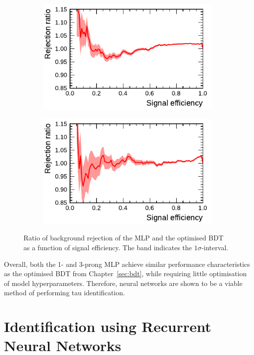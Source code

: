 \begin{figure}[htb]
  \begin{subfigure}[t]{0.48\textwidth}
    \centering
    \includegraphics{./figures/rnn/mlp/mlp_bdt_ratio_1p.pdf}
  \end{subfigure}\hfill
  \begin{subfigure}[t]{0.48\textwidth}
    \centering
    \includegraphics{./figures/rnn/mlp/mlp_bdt_ratio_3p.pdf}
  \end{subfigure}
  \caption{Ratio of background rejection of the MLP and the optimised BDT as a
    function of signal efficiency. The band indicates the $1\sigma$-interval.}
  \label{fig:roc_mlp_bdt_comparison}
\end{figure}

Overall, both the 1- and 3-prong MLP achieve similar performance characteristics
as the optimised BDT from Chapter~\ref{sec:bdt}, while requiring little
optimisation of model hyperparameters. Therefore, neural networks are shown to
be a viable method of performing tau identification.

\section{Identification using Recurrent Neural Networks}
\label{sec:rnn_id}

